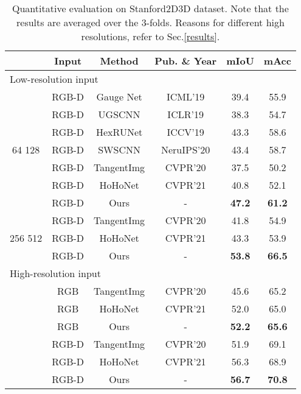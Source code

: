 \documentclass[runningheads]{llncs}
\begin{document}
	\setlength{\tabcolsep}{4pt}
	\begin{table}[t]
		\begin{center}
			\renewcommand{\arraystretch}{1.05}
			\caption{Quantitative evaluation on Stanford2D3D dataset.
				Note that the results are averaged over the 3-folds.
				Reasons for different high resolutions, refer to Sec.\ref{results}.}
			\label{quantitative results}
			\begin{tabular}{cccc||cc}
				\hline
				 & Input & Method & Pub. \& Year & mIoU  & mAcc  \\
				\hline\hline
				\multicolumn{6}{l}{Low-resolution input} \\
				\hline
				\multirow{7}{*}{64  128} 
				& RGB-D & Gauge Net \cite{cohen2019gauge} & ICML'19 & 39.4 & 55.9 \\
				& RGB-D & UGSCNN \cite{jiang2018spherical} & ICLR'19 & 38.3 & 54.7 \\
				& RGB-D & HexRUNet \cite{zhang2019orientation} & ICCV'19 & 43.3 & 58.6 \\
				& RGB-D & SWSCNN \cite{esteves2020spin} & NeruIPS'20 & 43.4 & 58.7 \\
				& RGB-D & TangentImg \cite{eder2020tangent} & CVPR'20 & 37.5 & 50.2 \\
				& RGB-D & HoHoNet \cite{sun2021hohonet} & CVPR'21 & 40.8 & 52.1 \\
				& RGB-D & Ours & - & \textbf{47.2} & \textbf{61.2} \\
				\hline
				\multirow{3}{*}{256  512} 
				& RGB-D & TangentImg \cite{eder2020tangent} & CVPR'20 & 41.8 & 54.9 \\
				& RGB-D & HoHoNet \cite{sun2021hohonet}  & CVPR'21 & 43.3 & 53.9 \\
				& RGB-D & Ours & - & \textbf{53.8} & \textbf{66.5} \\
				\hline\hline
				\multicolumn{6}{l}{High-resolution input} \\
				\hline
				 & RGB & TangentImg \cite{eder2020tangent} & CVPR'20 & 45.6 & 65.2 \\
				 & RGB & HoHoNet \cite{sun2021hohonet} & CVPR'21 & 52.0 & 65.0 \\
				 & RGB & Ours & - & \textbf{52.2} & \textbf{65.6} \\
				\hline
				 & RGB-D & TangentImg \cite{eder2020tangent} & CVPR'20 & 51.9 & 69.1 \\
				 & RGB-D & HoHoNet \cite{sun2021hohonet} & CVPR'21 & 56.3 & 68.9 \\
				 & RGB-D & Ours & - & \textbf{56.7} & \textbf{70.8} \\
				\hline
			\end{tabular}
		\end{center}
	\end{table}
	
\end{document}
